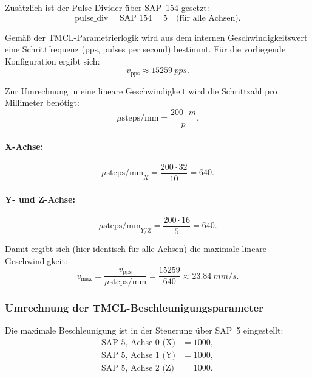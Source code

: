 Zusätzlich ist der Pulse Divider über SAP~154 gesetzt:
\begin{equation}
\text{pulse\_div}=\text{SAP 154}=5 \quad \text{(für alle Achsen)}.
\end{equation}

Gemäß der TMCL-Parametrierlogik wird aus dem internen Geschwindigkeitswert eine Schrittfrequenz
(pps, pulses per second) bestimmt. Für die vorliegende Konfiguration ergibt sich:
\begin{equation}
v_\text{pps}\approx \SI{15259}{pps}.
\end{equation}

Zur Umrechnung in eine lineare Geschwindigkeit wird die Schrittzahl pro Millimeter benötigt:
\begin{equation}
\mu\text{steps/mm}=\frac{200\cdot m}{p}.
\end{equation}

\paragraph{X-Achse:}
\begin{equation}
\mu\text{steps/mm}_X=\frac{200\cdot 32}{10} = 640.
\end{equation}

\paragraph{Y- und Z-Achse:}
\begin{equation}
\mu\text{steps/mm}_{Y/Z}=\frac{200\cdot 16}{5} = 640.
\end{equation}

Damit ergibt sich (hier identisch für alle Achsen) die maximale lineare Geschwindigkeit:
\begin{equation}
v_{\max}=\frac{v_\text{pps}}{\mu\text{steps/mm}}
=\frac{15259}{640}
\approx \SI{23,84}{mm/s}.
\end{equation}

\subsubsection{Umrechnung der TMCL-Beschleunigungsparameter}

Die maximale Beschleunigung ist in der Steuerung über SAP~5 eingestellt:
\begin{align}
\text{SAP 5, Achse 0 (X)} &= 1000,\\
\text{SAP 5, Achse 1 (Y)} &= 1000,\\
\text{SAP 5, Achse 2 (Z)} &= 1000.
\end{align}

